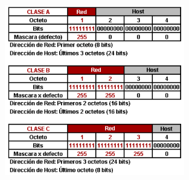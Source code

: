 \documentclass[letterpaper,12pt]{article}
\begin{document}
\begin{sloppypar}
\begin{figure}[H]
    \centering
    \includegraphics[width=0.7\textwidth]{redes4.png}
\end{figure}



\end{sloppypar}
\end{document}
